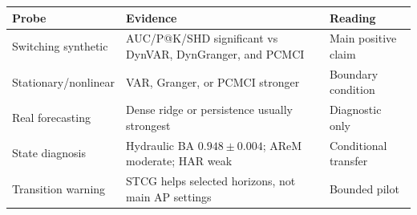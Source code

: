\begin{tabular}{lll}
\toprule
Probe & Evidence & Reading \\
\midrule
Switching synthetic & AUC/P@K/SHD significant vs DynVAR, DynGranger, and PCMCI & Main positive claim \\
Stationary/nonlinear & VAR, Granger, or PCMCI stronger & Boundary condition \\
Real forecasting & Dense ridge or persistence usually strongest & Diagnostic only \\
State diagnosis & Hydraulic BA $0.948 \pm 0.004$; AReM moderate; HAR weak & Conditional transfer \\
Transition warning & STCG helps selected horizons, not main AP settings & Bounded pilot \\
\bottomrule
\end{tabular}
